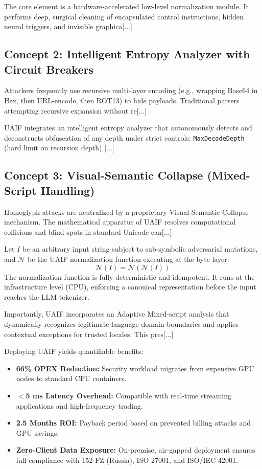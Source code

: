 \documentclass[10pt,a4paper]{article}
\begin{document}
The core element is a hardware-accelerated low-level normalization module. It performs deep, surgical cleaning of encapsulated control instructions, hidden neural triggers, and invisible graphica[...]

\subsection{Concept 2: Intelligent Entropy Analyzer with Circuit Breakers}
Attackers frequently use recursive multi-layer encoding (e.g., wrapping Base64 in Hex, then URL-encode, then ROT13) to hide payloads. Traditional parsers attempting recursive expansion without re[...]

UAIF integrates an intelligent entropy analyzer that autonomously detects and deconstructs obfuscation of any depth under strict controls: \texttt{MaxDecodeDepth} (hard limit on recursion depth) [...]

\subsection{Concept 3: Visual-Semantic Collapse (Mixed-Script Handling)}
Homoglyph attacks are neutralized by a proprietary Visual-Semantic Collapse mechanism. The mathematical apparatus of UAIF resolves computational collisions and blind spots in standard Unicode can[...]

Let $I$ be an arbitrary input string subject to sub-symbolic adversarial mutations, and $\mathcal{N}$ be the UAIF normalization function executing at the byte layer:
\begin{equation}
\mathcal{N}(I) = \mathcal{N}(\mathcal{N}(I))
\end{equation}
The normalization function is fully deterministic and idempotent. It runs at the infrastructure level (CPU), enforcing a canonical representation before the input reaches the LLM tokenizer.

Importantly, UAIF incorporates an Adaptive Mixed-script analysis that dynamically recognizes legitimate language domain boundaries and applies contextual exceptions for trusted locales. This pres[...]

Deploying UAIF yields quantifiable benefits:
\begin{itemize}
    \item \textbf{66\% OPEX Reduction:} Security workload migrates from expensive GPU nodes to standard CPU containers.
    \item \textbf{$<$5 ms Latency Overhead:} Compatible with real-time streaming applications and high-frequency trading.
    \item \textbf{2.5 Months ROI:} Payback period based on prevented billing attacks and GPU savings.
    \item \textbf{Zero-Client Data Exposure:} On-premise, air-gapped deployment ensures full compliance with 152-FZ (Russia), ISO 27001, and ISO/IEC 42001.
\end{itemize}
\end{document}
